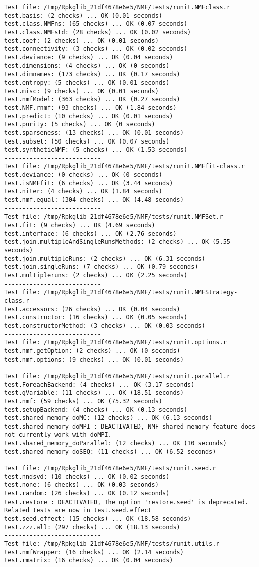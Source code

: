 \documentclass[10pt]{article}\usepackage[]{graphicx}\usepackage[]{color}
\begin{document}
\begin{verbatim}
Test file: /tmp/Rpkglib_21df4678e6e5/NMF/tests/runit.NMFclass.r 
test.basis: (2 checks) ... OK (0.01 seconds)
test.class.NMFns: (65 checks) ... OK (0.07 seconds)
test.class.NMFstd: (28 checks) ... OK (0.02 seconds)
test.coef: (2 checks) ... OK (0.01 seconds)
test.connectivity: (3 checks) ... OK (0.02 seconds)
test.deviance: (9 checks) ... OK (0.04 seconds)
test.dimensions: (4 checks) ... OK (0 seconds)
test.dimnames: (173 checks) ... OK (0.17 seconds)
test.entropy: (5 checks) ... OK (0.01 seconds)
test.misc: (9 checks) ... OK (0.01 seconds)
test.nmfModel: (363 checks) ... OK (0.27 seconds)
test.NMF.rnmf: (93 checks) ... OK (1.84 seconds)
test.predict: (10 checks) ... OK (0.01 seconds)
test.purity: (5 checks) ... OK (0 seconds)
test.sparseness: (13 checks) ... OK (0.01 seconds)
test.subset: (50 checks) ... OK (0.07 seconds)
test.syntheticNMF: (5 checks) ... OK (1.53 seconds)
--------------------------- 
Test file: /tmp/Rpkglib_21df4678e6e5/NMF/tests/runit.NMFfit-class.r 
test.deviance: (0 checks) ... OK (0 seconds)
test.isNMFfit: (6 checks) ... OK (3.44 seconds)
test.niter: (4 checks) ... OK (1.84 seconds)
test.nmf.equal: (304 checks) ... OK (4.48 seconds)
--------------------------- 
Test file: /tmp/Rpkglib_21df4678e6e5/NMF/tests/runit.NMFSet.r 
test.fit: (9 checks) ... OK (4.69 seconds)
test.interface: (6 checks) ... OK (2.76 seconds)
test.join.multipleAndSingleRunsMethods: (2 checks) ... OK (5.55 seconds)
test.join.multipleRuns: (2 checks) ... OK (6.31 seconds)
test.join.singleRuns: (7 checks) ... OK (0.79 seconds)
test.multipleruns: (2 checks) ... OK (2.25 seconds)
--------------------------- 
Test file: /tmp/Rpkglib_21df4678e6e5/NMF/tests/runit.NMFStrategy-class.r 
test.accessors: (26 checks) ... OK (0.04 seconds)
test.constructor: (16 checks) ... OK (0.05 seconds)
test.constructorMethod: (3 checks) ... OK (0.03 seconds)
--------------------------- 
Test file: /tmp/Rpkglib_21df4678e6e5/NMF/tests/runit.options.r 
test.nmf.getOption: (2 checks) ... OK (0 seconds)
test.nmf.options: (9 checks) ... OK (0.01 seconds)
--------------------------- 
Test file: /tmp/Rpkglib_21df4678e6e5/NMF/tests/runit.parallel.r 
test.ForeachBackend: (4 checks) ... OK (3.17 seconds)
test.gVariable: (11 checks) ... OK (18.51 seconds)
test.nmf: (59 checks) ... OK (75.32 seconds)
test.setupBackend: (4 checks) ... OK (0.13 seconds)
test.shared_memory_doMC: (12 checks) ... OK (6.13 seconds)
test.shared_memory_doMPI : DEACTIVATED, NMF shared memory feature does not currently work with doMPI.
test.shared_memory_doParallel: (12 checks) ... OK (10 seconds)
test.shared_memory_doSEQ: (11 checks) ... OK (6.52 seconds)
--------------------------- 
Test file: /tmp/Rpkglib_21df4678e6e5/NMF/tests/runit.seed.r 
test.nndsvd: (10 checks) ... OK (0.02 seconds)
test.none: (6 checks) ... OK (0.03 seconds)
test.random: (26 checks) ... OK (0.12 seconds)
test.restore : DEACTIVATED, The option 'restore.seed' is deprecated. Related tests are now in test.seed.effect
test.seed.effect: (15 checks) ... OK (18.58 seconds)
test.zzz.all: (297 checks) ... OK (18.13 seconds)
--------------------------- 
Test file: /tmp/Rpkglib_21df4678e6e5/NMF/tests/runit.utils.r 
test.nmfWrapper: (16 checks) ... OK (2.14 seconds)
test.rmatrix: (16 checks) ... OK (0.04 seconds)


\end{verbatim}
\end{document}
